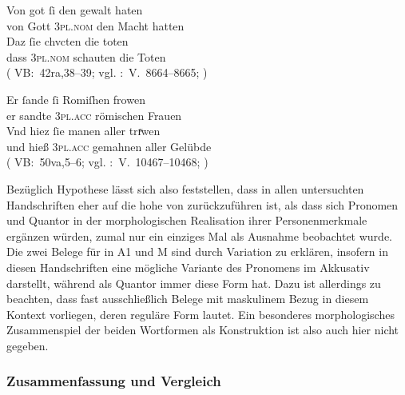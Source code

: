 \begin{exe}
\ex \label{ex:vbsisie}
 	\begin{xlist}
 	\ex \gll Von got ſi den gewalt haten \\
		     von Gott \textsc{3pl\subM.nom} den Macht hatten \\
 	\sn \gll Daz ſie chvcten die toten \\
		     dass \textsc{3pl\subM.nom} schauten die Toten \\
		\trans {}
			(%
				VB:~42ra,38--39; vgl.
				\KC:~V.~8664--8665;
				\cite[241]{schroeder1895}%
			)
 		\label{ex:vbsisie_1}

	\ex \gll Er ſande ſi Romiſhen frowen \\
		     er sandte \textsc{3pl\subI.acc} römischen Frauen \\
	\sn \gll Vnd hiez ſie manen aller trıͮwen \\
		     und hieß \textsc{3pl\subF.acc} gemahnen aller Gelübde \\
		\trans {}
			(%
				VB:~50va,5--6; vgl.
				\KC:~V.~10467--10468;
				\cite[273]{schroeder1895}%
			)
		\label{ex:vbsisie_2}
	\end{xlist}%
\end{exe}

Bezüglich  Hypothese lässt sich also feststellen, dass
 in allen unter\-suchten Handschriften eher auf die hohe
 von  zurückzuführen ist, als dass sich Pro\-nomen und
Quantor in der morphologischen Realisation ihrer Personenmerkmale ergänzen
würden, zumal  nur ein einziges Mal als Ausnahme
beobachtet wurde. Die zwei Belege für  in A1 und M sind durch
Variation zu erklären, insofern  in diesen Handschriften eine
mög\-liche Variante des Pronomens im Akkusativ darstellt, während 
als Quantor immer diese Form hat. Dazu ist allerdings zu beachten, dass fast
ausschließlich Belege mit maskulinem Bezug in diesem Kontext vorliegen, deren
reguläre Form  lautet. Ein besonderes morphologisches Zusammenspiel
der beiden Wortformen als Konstruktion ist also auch hier nicht gegeben.


\subsubsection{Zusammenfassung und Vergleich}
\label{subsubsec:persfeatsmry}

